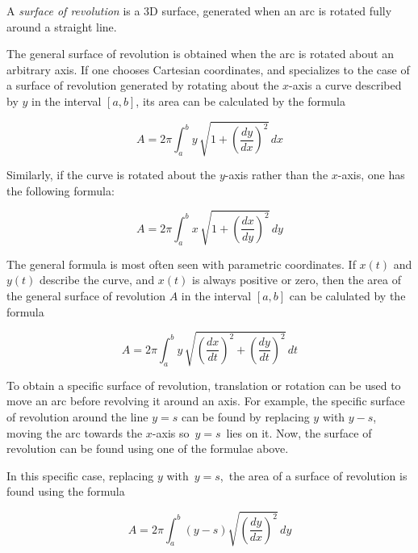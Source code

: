 \documentclass[12pt]{article}
\begin{document}
A \emph{surface of revolution} is a 3D surface, generated when an arc is rotated fully around a straight line.

The general surface of revolution is obtained when the arc is rotated about an arbitrary axis. If one chooses Cartesian coordinates, and specializes to the case of a surface of revolution generated by rotating about the $x$-axis a curve described by $y$ in the interval $[a, b]$, its area can be calculated by the formula

$$A = 2 \pi \int_{a}^{b} y \, \sqrt{ 1 + \left(\frac{dy}{dx}\right)^2 } \, dx$$

Similarly, if the curve is rotated about the $y$-axis rather than the $x$-axis, one has the following formula:

$$A = 2 \pi \int_{a}^{b} x \, \sqrt{ 1 + \left(\frac{dx}{dy}\right)^2 } \, dy$$

The general formula is most often seen with parametric coordinates. If $x(t)$ and $y(t)$ describe the curve, and $x(t)$ is always positive or zero, then the area of the general surface of revolution $A$ in the interval $[a, b]$ can be calulated by the formula

$$A = 2 \pi \int_{a}^{b} y \, \sqrt{ \left(\frac{dx}{dt}\right)^2 + \left(\frac{dy}{dt}\right)^2 } \, dt$$

To obtain a specific surface of revolution, translation or rotation can be used to move an arc before revolving it around an axis. For example, the specific surface of revolution around the line $y = s$ can be found by replacing $y$ with $y\!-\!s$, moving the arc towards the $x$-axis so\, $y = s$\, lies on it. Now, the surface of revolution can be found using one of the formulae above.

In this specific case, replacing $y$ with\, $y = s$,\, the area of a surface of revolution is found using the formula

$$A = 2 \pi \int_{a}^{b} (y-s) \sqrt{ \left(\frac{dy}{dx}\right)^2 } \, dy$$
\end{document}
